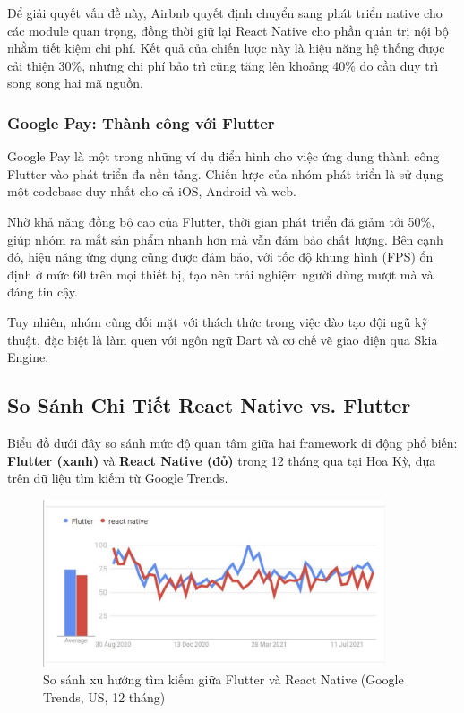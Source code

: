 \vspace{0.5em}

Để giải quyết vấn đề này, Airbnb quyết định chuyển sang phát triển native cho các module quan trọng,  
đồng thời giữ lại React Native cho phần quản trị nội bộ nhằm tiết kiệm chi phí. Kết quả của chiến lược này là hiệu năng hệ thống được cải thiện 30\%,  
nhưng chi phí bảo trì cũng tăng lên khoảng 40\% do cần duy trì song song hai mã nguồn.

\subsubsection{Google Pay: Thành công với Flutter}

Google Pay là một trong những ví dụ điển hình cho việc ứng dụng thành công Flutter vào phát triển đa nền tảng. Chiến lược của nhóm phát triển là sử dụng một codebase duy nhất cho cả iOS, Android và web.

\vspace{0.5em}

Nhờ khả năng đồng bộ cao của Flutter, thời gian phát triển đã giảm tới 50\%, giúp nhóm ra mắt sản phẩm nhanh hơn mà vẫn đảm bảo chất lượng. Bên cạnh đó, hiệu năng ứng dụng cũng được đảm bảo, với tốc độ khung hình (FPS) ổn định ở mức 60 trên mọi thiết bị, tạo nên trải nghiệm người dùng mượt mà và đáng tin cậy.

\vspace{0.5em}

Tuy nhiên, nhóm cũng đối mặt với thách thức trong việc đào tạo đội ngũ kỹ thuật,  
đặc biệt là làm quen với ngôn ngữ Dart và cơ chế vẽ giao diện qua Skia Engine.

\subsection{So Sánh Chi Tiết React Native vs. Flutter}
\renewcommand{\labelitemi}{--}    

    Biểu đồ dưới đây so sánh mức độ quan tâm giữa hai framework di động phổ biến: \textbf{Flutter (xanh)} và \textbf{React Native (đỏ)} trong 12 tháng qua tại Hoa Kỳ, dựa trên dữ liệu tìm kiếm từ Google Trends.

    \begin{figure}[H]
        \centering
        \includegraphics[width=0.9\textwidth]{images/reactNative_flutter.png}
        \caption{So sánh xu hướng tìm kiếm giữa Flutter và React Native (Google Trends, US, 12 tháng)}
    \end{figure}

